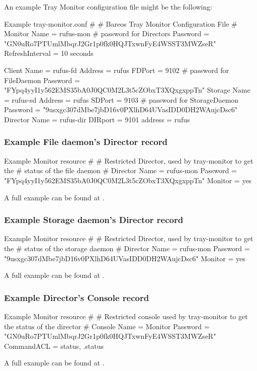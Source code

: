 An example Tray Monitor configuration file might be the following:

\begin{bconfig}{Example tray-monitor.conf}
#
# Bareos Tray Monitor Configuration File
#
Monitor {
  Name = rufus-mon        # password for Directors
  Password = "GN0uRo7PTUmlMbqrJ2Gr1p0fk0HQJTxwnFyE4WSST3MWZseR"
  RefreshInterval = 10 seconds
}

Client {
  Name = rufus-fd
  Address = rufus
  FDPort = 9102           # password for FileDaemon
  Password = "FYpq4yyI1y562EMS35bA0J0QC0M2L3t5cZObxT3XQxgxppTn"
}
Storage {
  Name = rufus-sd
  Address = rufus
  SDPort = 9103           # password for StorageDaemon
  Password = "9usxgc307dMbe7jbD16v0PXlhD64UVasIDD0DH2WAujcDsc6"
}
Director {
  Name = rufus-dir
  DIRport = 9101
  address = rufus
}
\end{bconfig}



\subsubsection*{Example File daemon's Director record}

\begin{bconfig}{Example Monitor resource}
#
# Restricted Director, used by tray-monitor to get the
#   status of the file daemon
#
Director {
  Name = rufus-mon
  Password = "FYpq4yyI1y562EMS35bA0J0QC0M2L3t5cZObxT3XQxgxppTn"
  Monitor = yes
}
\end{bconfig}

A full example can be found at .



\subsubsection*{Example Storage daemon's Director record}

\begin{bconfig}{Example Monitor resource}
#
# Restricted Director, used by tray-monitor to get the
#   status of the storage daemon
#
Director {
  Name = rufus-mon
  Password = "9usxgc307dMbe7jbD16v0PXlhD64UVasIDD0DH2WAujcDsc6"
  Monitor = yes
}
\end{bconfig}

A full example can be found at .



\subsubsection*{Example Director's Console record}

\begin{bconfig}{Example Monitor resource}
#
# Restricted console used by tray-monitor to get the status of the director
#
Console {
  Name = Monitor
  Password = "GN0uRo7PTUmlMbqrJ2Gr1p0fk0HQJTxwnFyE4WSST3MWZseR"
  CommandACL = status, .status
}
\end{bconfig}

A full example can be found at .
